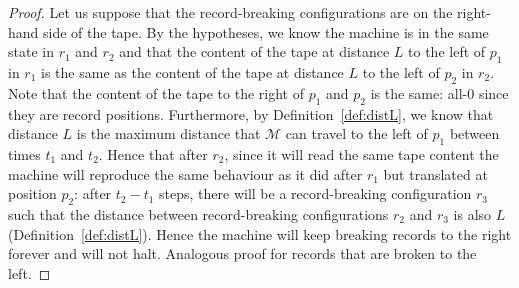 \begin{proof}
  Let us suppose that the record-breaking configurations are on the right-hand side of the tape. By the hypotheses, we know the machine is in the same state in $r_1$ and $r_2$ and that the content of the tape at distance $L$ to the left of $p_1$ in $r_1$ is the same as the content of the tape at distance $L$ to the left of $p_2$ in $r_2$. Note that the content of the tape to the right of $p_1$ and $p_2$ is the same: all-0 since they are record positions. Furthermore, by Definition~\ref{def:distL}, we know that distance $L$ is the maximum distance that $\mathcal{M}$ can travel to the left of $p_1$ between times $t_1$ and $t_2$. Hence that after $r_2$, since it will read the same tape content the machine will reproduce the same behaviour as it did after $r_1$ but translated at position $p_2$: after $t_2 - t_1$ steps, there will be a record-breaking configuration $r_3$ such that the distance between record-breaking configurations $r_2$ and $r_3$ is also $L$ (Definition~\ref{def:distL}). Hence the machine will keep breaking records to the right forever and will not halt. Analogous proof for records that are broken to the left.
\end{proof}

